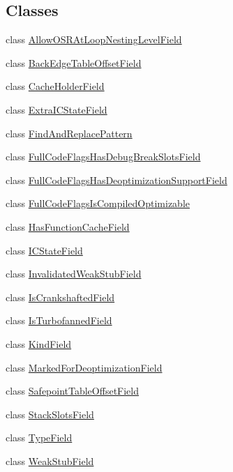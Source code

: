\subsection*{Classes}
\begin{DoxyCompactItemize}
\item 
class \hyperlink{classv8_1_1internal_1_1_code_1_1_allow_o_s_r_at_loop_nesting_level_field}{Allow\+O\+S\+R\+At\+Loop\+Nesting\+Level\+Field}
\item 
class \hyperlink{classv8_1_1internal_1_1_code_1_1_back_edge_table_offset_field}{Back\+Edge\+Table\+Offset\+Field}
\item 
class \hyperlink{classv8_1_1internal_1_1_code_1_1_cache_holder_field}{Cache\+Holder\+Field}
\item 
class \hyperlink{classv8_1_1internal_1_1_code_1_1_extra_i_c_state_field}{Extra\+I\+C\+State\+Field}
\item 
class \hyperlink{classv8_1_1internal_1_1_code_1_1_find_and_replace_pattern}{Find\+And\+Replace\+Pattern}
\item 
class \hyperlink{classv8_1_1internal_1_1_code_1_1_full_code_flags_has_debug_break_slots_field}{Full\+Code\+Flags\+Has\+Debug\+Break\+Slots\+Field}
\item 
class \hyperlink{classv8_1_1internal_1_1_code_1_1_full_code_flags_has_deoptimization_support_field}{Full\+Code\+Flags\+Has\+Deoptimization\+Support\+Field}
\item 
class \hyperlink{classv8_1_1internal_1_1_code_1_1_full_code_flags_is_compiled_optimizable}{Full\+Code\+Flags\+Is\+Compiled\+Optimizable}
\item 
class \hyperlink{classv8_1_1internal_1_1_code_1_1_has_function_cache_field}{Has\+Function\+Cache\+Field}
\item 
class \hyperlink{classv8_1_1internal_1_1_code_1_1_i_c_state_field}{I\+C\+State\+Field}
\item 
class \hyperlink{classv8_1_1internal_1_1_code_1_1_invalidated_weak_stub_field}{Invalidated\+Weak\+Stub\+Field}
\item 
class \hyperlink{classv8_1_1internal_1_1_code_1_1_is_crankshafted_field}{Is\+Crankshafted\+Field}
\item 
class \hyperlink{classv8_1_1internal_1_1_code_1_1_is_turbofanned_field}{Is\+Turbofanned\+Field}
\item 
class \hyperlink{classv8_1_1internal_1_1_code_1_1_kind_field}{Kind\+Field}
\item 
class \hyperlink{classv8_1_1internal_1_1_code_1_1_marked_for_deoptimization_field}{Marked\+For\+Deoptimization\+Field}
\item 
class \hyperlink{classv8_1_1internal_1_1_code_1_1_safepoint_table_offset_field}{Safepoint\+Table\+Offset\+Field}
\item 
class \hyperlink{classv8_1_1internal_1_1_code_1_1_stack_slots_field}{Stack\+Slots\+Field}
\item 
class \hyperlink{classv8_1_1internal_1_1_code_1_1_type_field}{Type\+Field}
\item 
class \hyperlink{classv8_1_1internal_1_1_code_1_1_weak_stub_field}{Weak\+Stub\+Field}
\end{DoxyCompactItemize}

